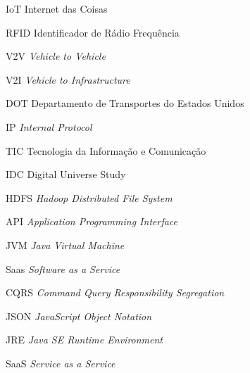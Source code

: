 \begin{siglas}
  \item[IoT] Internet das Coisas
  \item[RFID] Identificador de Rádio Frequência
  \item[V2V] \textit{Vehicle to Vehicle}
  \item[V2I] \textit{Vehicle to Infrastructure}
  \item[DOT] Departamento de Transportes do Estados Unidos
  \item[IP]  \textit{Internal Protocol}
  \item[TIC] Tecnologia da Informação e Comunicação
  \item[IDC] Digital Universe Study
  \item[HDFS] \textit{Hadoop Distributed File System}
  \item[API] \textit{Application Programming Interface}
  \item[JVM] \textit{Java Virtual Machine}
  \item[Saas] \textit{Software as a Service}
  \item[CQRS] \textit{Command Query Responsibility Segregation}
  \item[JSON] \textit{JavaScript Object Notation}
  \item[JRE] \textit{Java SE Runtime Environment}
  \item[SaaS] \textit{Service as a Service}
\end{siglas}